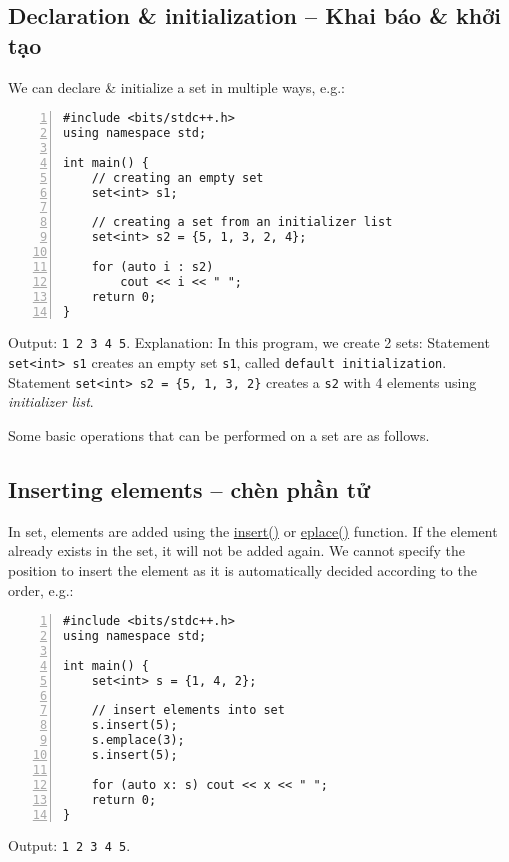 \documentclass{article}
\begin{document}
\subsection{Declaration \& initialization -- Khai báo \& khởi tạo}
We can declare \& initialize a set in multiple ways, e.g.:
\begin{Verbatim}[numbers=left,xleftmargin=5mm]
#include <bits/stdc++.h>
using namespace std;

int main() {
    // creating an empty set
    set<int> s1;
	
    // creating a set from an initializer list
    set<int> s2 = {5, 1, 3, 2, 4};
	
    for (auto i : s2) 
        cout << i << " ";
    return 0;
}
\end{Verbatim}
Output: {\tt1 2 3 4 5}. Explanation: In this program, we create 2 sets: Statement {\tt set<int> s1} creates an empty set {\tt s1}, called {\tt default initialization}. Statement \verb|set<int> s2 = {5, 1, 3, 2}| creates a {\tt s2} with 4 elements using {\it initializer list}.

Some basic operations that can be performed on a set are as follows.


\subsection{Inserting elements -- chèn phần tử}
In set, elements are added using the \href{https://www.geeksforgeeks.org/set-insert-function-in-c-stl/}{insert()} or \href{https://www.geeksforgeeks.org/setemplace-c-stl/}{eplace()} function. If the element already exists in the set, it will not be added again. We cannot specify the position to insert the element as it is automatically decided according to the order, e.g.:
\begin{Verbatim}[numbers=left,xleftmargin=5mm]
#include <bits/stdc++.h>
using namespace std;

int main() {
    set<int> s = {1, 4, 2};
	
    // insert elements into set
    s.insert(5);
    s.emplace(3);
    s.insert(5);
	
    for (auto x: s) cout << x << " ";
    return 0;
}
\end{Verbatim}
Output: {\tt1 2 3 4 5}.

\end{document}
